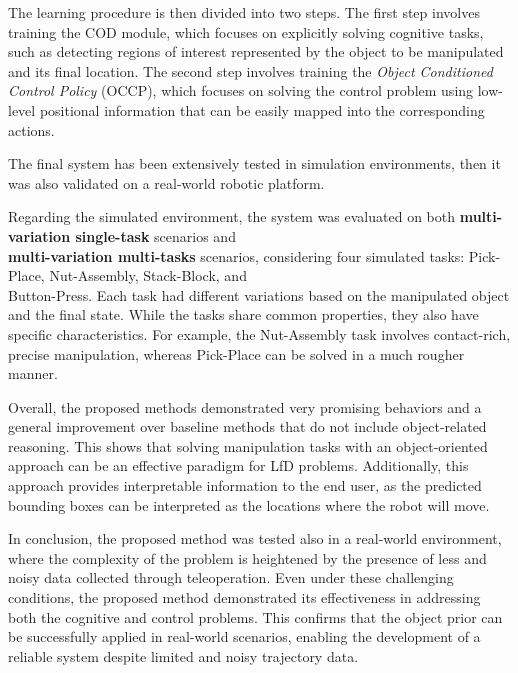 The learning procedure is then divided into two steps. The first step involves training the COD module, which focuses on explicitly solving cognitive tasks, such as detecting regions of interest represented by the object to be manipulated and its final location. The second step involves training the \textit{Object Conditioned Control Policy} (OCCP), which focuses on solving the control problem using low-level positional information that can be easily mapped into the corresponding actions.

The final system has been extensively tested in simulation environments, then it was also validated on a real-world robotic platform. 

Regarding the simulated environment, the system was evaluated on both \textbf{multi-variation single-task} scenarios and \\ \textbf{multi-variation multi-tasks} scenarios, considering four simulated tasks: Pick-Place, Nut-Assembly, Stack-Block, and \\ Button-Press. Each task had different variations based on the manipulated object and the final state. While the tasks share common properties, they also have specific characteristics. For example, the Nut-Assembly task involves contact-rich, precise manipulation, whereas Pick-Place can be solved in a much rougher manner.

Overall, the proposed methods demonstrated very promising behaviors and a general improvement over baseline methods that do not include object-related reasoning. This shows that solving manipulation tasks with an object-oriented approach can be an effective paradigm for LfD problems. Additionally, this approach provides interpretable information to the end user, as the predicted bounding boxes can be interpreted as the locations where the robot will move.

In conclusion, the proposed method was tested also in a real-world environment, where the complexity of the problem is heightened by the presence of less and noisy data collected through teleoperation. Even under these challenging conditions, the proposed method demonstrated its effectiveness in addressing both the cognitive and control problems. This confirms that the object prior can be successfully applied in real-world scenarios, enabling the development of a reliable system despite limited and noisy trajectory data.
